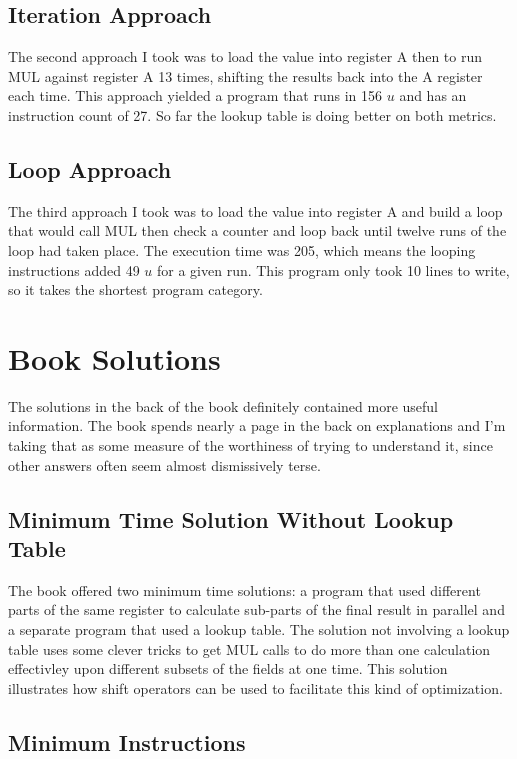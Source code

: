 \documentclass{article}
\begin{document}
\subsection {
  Iteration Approach
}

The second approach I took was to load the value into register A then
to run MUL against register A 13 times, shifting the results back into
the A register each time.  This approach yielded a program that runs in
156 $u$ and has an instruction count of 27. So far the lookup table is
doing better on both metrics.

\subsection {
  Loop Approach
}

The third approach I took was to load the value into register A and build
a loop that would call MUL then check a counter and loop back until twelve
runs of the loop had taken place.  The execution time was 205, which means
the looping instructions added 49 $u$ for a given run.  This program only
took 10 lines to write, so it takes the shortest program category.

\section {
  Book Solutions
}

The solutions in the back of the book definitely contained more useful
information.  The book spends nearly a page in the back on explanations
and I'm taking that as some measure of the worthiness of trying to
understand it, since other answers often seem almost dismissively terse.

\subsection {
  Minimum Time Solution Without Lookup Table
}

The book offered two minimum time solutions: a program that used different
parts of the same register to calculate sub-parts of the final result in parallel
and a separate program that used a lookup table.  The solution not involving
a lookup table uses some clever tricks to get MUL calls to do more than one
calculation effectivley upon different subsets of the fields at one time.
This solution illustrates how shift operators can be used to facilitate this
kind of optimization.

\subsection {
  Minimum Instructions
}
\end{document}
